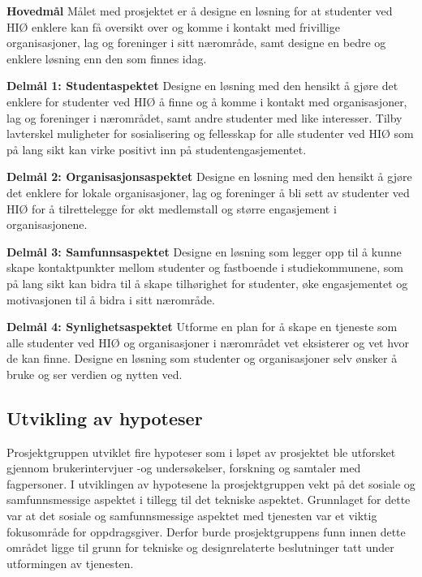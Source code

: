 \begin{compactitem}
\item [{\bf Hovedmål}] Målet med prosjektet er å designe en løsning for at studenter ved HIØ enklere kan få oversikt over og komme i kontakt med frivillige organisasjoner, lag og foreninger i sitt nærområde, samt designe en bedre og enklere løsning enn den som finnes idag.
\begin{compactitem}
\item [{\bf  Delmål 1: Studentaspektet} ] Designe en løsning med den hensikt å gjøre det enklere for studenter ved HIØ å finne og å komme i kontakt med organisasjoner, lag og foreninger i nærområdet, samt andre studenter med like interesser. Tilby lavterskel muligheter for sosialisering og fellesskap for alle studenter ved HIØ som på lang sikt kan virke positivt inn på studentengasjementet.
\item [{\bf  Delmål 2: Organisasjonsaspektet} ] Designe en løsning med den hensikt å gjøre det enklere for lokale organisasjoner, lag og foreninger å bli sett av studenter ved HIØ for å tilrettelegge for økt medlemstall og større engasjement i organisasjonene.
\item [{\bf  Delmål 3: Samfunnsaspektet} ] Designe en løsning som legger opp til å kunne skape kontaktpunkter mellom studenter og fastboende i studiekommunene, som på lang sikt kan bidra til å skape tilhørighet for studenter, øke engasjementet og motivasjonen til å bidra i sitt nærområde.
\item [{\bf  Delmål 4: Synlighetsaspektet} ] Utforme en plan for å skape en tjeneste som alle studenter ved HIØ og organisasjoner i nærområdet vet eksisterer og vet hvor de kan finne. Designe en løsning som studenter og organisasjoner selv ønsker å bruke og ser verdien og nytten ved.
\end{compactitem} 
\end{compactitem}

\subsection{Utvikling av hypoteser}
\label{section:hypoteser}
Prosjektgruppen utviklet fire hypoteser som i løpet av prosjektet ble utforsket gjennom brukerintervjuer -og undersøkelser, forskning og samtaler med fagpersoner. I utviklingen av hypotesene la prosjektgruppen vekt på det sosiale og samfunnsmessige aspektet i tillegg til det tekniske aspektet. Grunnlaget for dette var at det sosiale og samfunnsmessige aspektet med tjenesten var et viktig fokusområde for oppdragsgiver. Derfor burde prosjektgruppens funn innen dette området ligge til grunn for tekniske og designrelaterte beslutninger tatt under utformingen av tjenesten.

